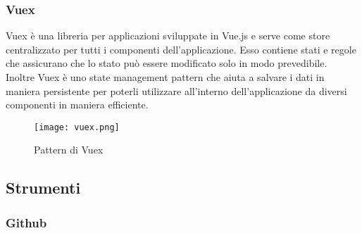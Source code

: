 \subsubsection{Vuex}
\label{subsubsec:vuex}

Vuex è una libreria  per applicazioni sviluppate in Vue.js e serve come store centralizzato per tutti i componenti dell'applicazione. Esso contiene stati e regole che assicurano che lo stato può essere modificato solo in modo prevedibile.\\
Inoltre Vuex è uno state management pattern che aiuta a salvare i dati in maniera persistente per poterli utilizzare all'interno dell'applicazione da diversi componenti in maniera efficiente.
\begin{figure}[H]
	\begin{center}
		\texttt{[image: vuex.png]}
		\caption{Pattern di Vuex}
	\end{center}
\end{figure}

\subsection{Strumenti}
\label{subsec:strumenti}

\subsubsection{Github}
\label{subsubsec:github}


